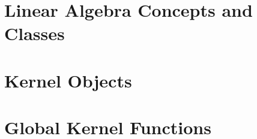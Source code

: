 


\lcTex{}

\clearpage
\section{Linear Algebra Concepts and Classes}
\gdef\ccRefPageBreak{\ccFalse}

\gdef\ccRefPageBreak{\ccTrue}





\clearpage
\section{Kernel Objects}
\gdef\ccRefPageBreak{\ccFalse}


\gdef\ccRefPageBreak{\ccTrue}












\clearpage
\section{Global Kernel Functions}
\gdef\ccRefPageBreak{\ccFalse}


\gdef\ccRefPageBreak{\ccTrue}





















